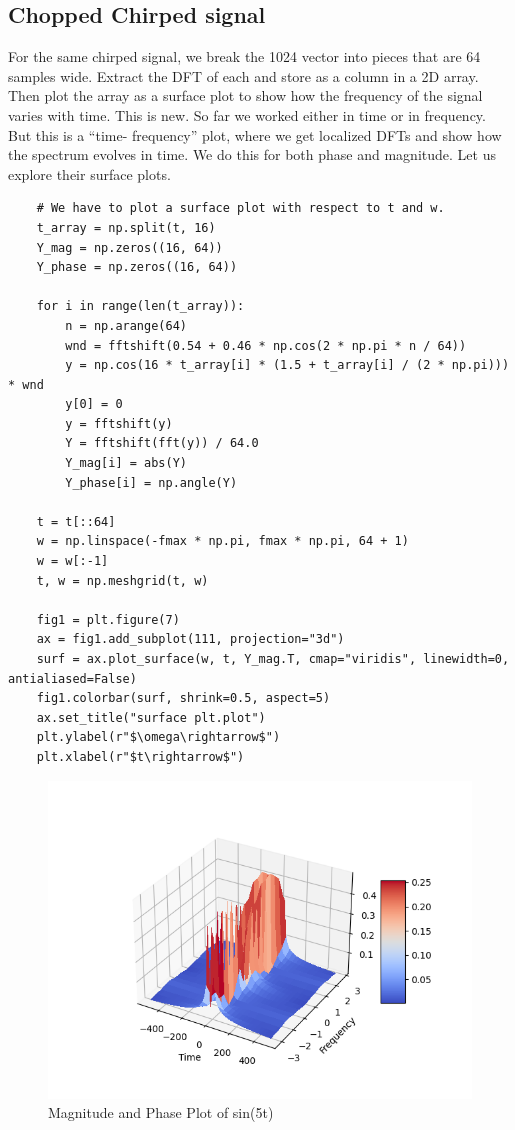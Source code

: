 \documentclass{article}
\begin{document}
\subsection{Chopped Chirped signal}
For the same chirped signal, we break the 1024 vector into pieces that are 64 samples wide.
Extract the DFT of each and store as a column in a 2D array. Then plot the array as a surface plot to show how the frequency of the signal varies with time.
This is new. So far we worked either in time or in frequency. But this is a “time- frequency” plot, where we get localized DFTs and show how the spectrum evolves in time.
We do this for both phase and magnitude. Let us explore their surface plots.

\begin{verbatim}
    # We have to plot a surface plot with respect to t and w.
    t_array = np.split(t, 16)
    Y_mag = np.zeros((16, 64))
    Y_phase = np.zeros((16, 64))
    
    for i in range(len(t_array)):
        n = np.arange(64)
        wnd = fftshift(0.54 + 0.46 * np.cos(2 * np.pi * n / 64))
        y = np.cos(16 * t_array[i] * (1.5 + t_array[i] / (2 * np.pi))) * wnd
        y[0] = 0
        y = fftshift(y)
        Y = fftshift(fft(y)) / 64.0
        Y_mag[i] = abs(Y)
        Y_phase[i] = np.angle(Y)
    
    t = t[::64]
    w = np.linspace(-fmax * np.pi, fmax * np.pi, 64 + 1)
    w = w[:-1]
    t, w = np.meshgrid(t, w)
    
    fig1 = plt.figure(7)
    ax = fig1.add_subplot(111, projection="3d")
    surf = ax.plot_surface(w, t, Y_mag.T, cmap="viridis", linewidth=0, antialiased=False)
    fig1.colorbar(surf, shrink=0.5, aspect=5)
    ax.set_title("surface plt.plot")
    plt.ylabel(r"$\omega\rightarrow$")
    plt.xlabel(r"$t\rightarrow$")
\end{verbatim}

 \begin{figure}[!ht]
  \centering
  \includegraphics[scale=0.6]{Figure_13.png}
  \caption{Magnitude and Phase Plot of sin(5t)}
  \label{fig:sample}
  \end{figure}
  
\end{document}
